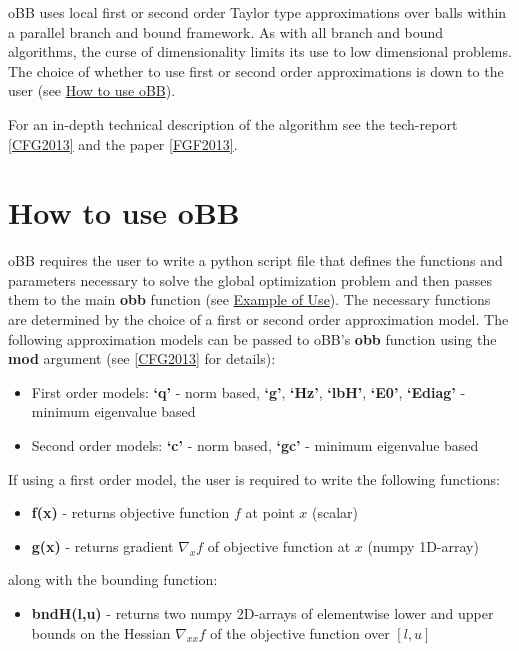 \documentclass[letterpaper,11pt,openany,oneside]{sphinxmanual}
\begin{document}
oBB uses local first or second order Taylor type approximations over balls within a parallel branch and bound framework. As with all branch and bound algorithms, the curse of dimensionality limits its use to low dimensional problems. The choice of whether to use first or second order approximations is down to the user  (see {\hyperref[userguide:how-to-use-obb]{How to use oBB}}).

For an in-depth technical description of the algorithm see the tech-report {\hyperref[userguide:cfg2013]{{[}CFG2013{]}}} and the paper {\hyperref[userguide:fgf2013]{{[}FGF2013{]}}}.


\section{How to use oBB}
\label{userguide:how-to-use-obb}
oBB requires the user to write a python script file that defines the functions and parameters necessary to solve the global optimization problem and then passes them to the main \textbf{obb} function (see {\hyperref[userguide:example-of-use]{Example of Use}}). The necessary functions are determined by the choice of a first or second order approximation model. The following approximation models can be passed to oBB's \textbf{obb} function using the \textbf{mod} argument (see {\hyperref[userguide:cfg2013]{{[}CFG2013{]}}} for details):
\begin{itemize}
\item {} 
First order models: \textbf{`q'} - norm based,  \textbf{`g'}, \textbf{`Hz'}, \textbf{`lbH'}, \textbf{`E0'}, \textbf{`Ediag'} - minimum eigenvalue based

\item {} 
Second order models: \textbf{`c'} - norm based, \textbf{`gc'} - minimum eigenvalue based

\end{itemize}

If using a first order model, the user is required to write the following functions:
\begin{itemize}
\item {} 
\textbf{f(x)} - returns objective function $f$ at point $x$ (scalar)

\item {} 
\textbf{g(x)} - returns gradient $\nabla_x f$ of objective function at $x$ (numpy 1D-array)

\end{itemize}

along with the bounding function:
\begin{itemize}
\item {} 
\textbf{bndH(l,u)} - returns two numpy 2D-arrays of elementwise lower and upper bounds on the Hessian $\nabla_{xx} f$ of the objective function over $[l,u]$

\end{itemize}
\end{document}
